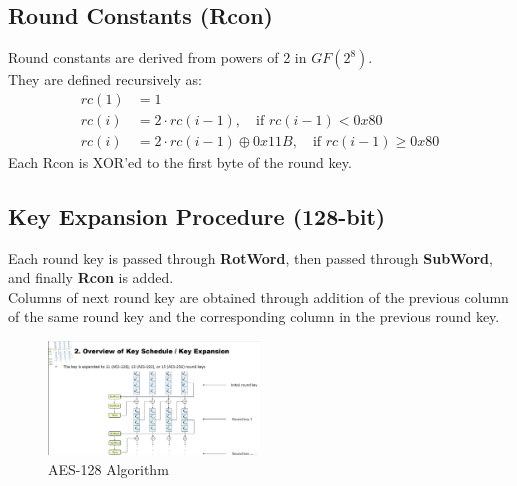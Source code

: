 \documentclass[12pt,a4paper]{report}
\begin{document}
\subsection{Round Constants (Rcon)}
Round constants are derived from powers of 2 in $GF(2^8)$.\\
They are defined recursively as:
\[
\begin{aligned}
rc(1) &= 1 \\
rc(i) &= 2 \cdot rc(i-1), \quad \text{if } rc(i-1) < 0x80 \\
rc(i) &= 2 \cdot rc(i-1) \oplus 0x11B, \quad \text{if } rc(i-1) \ge 0x80
\end{aligned}
\]
Each Rcon is XOR'ed to the first byte of the round key.

\subsection{Key Expansion Procedure (128-bit)}
Each round key is passed through \textbf{RotWord}, then passed through \textbf{SubWord}, and finally \textbf{Rcon} is added.\\
Columns of next round key are obtained through addition of the previous column of the same round key and the corresponding column in the previous round key.
\begin{figure}[H]
    \centering
    \includegraphics[width=0.5\textwidth]{screenshot.png}
    \caption{AES-128 Algorithm}
\end{figure}
\end{document}
